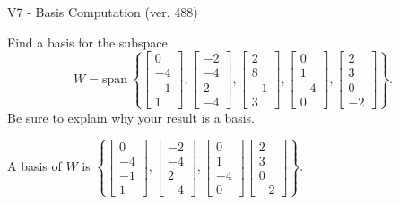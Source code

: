 \begin{exercise}
  \begin{exerciseTitle}V7 - Basis Computation (ver. 488)\end{exerciseTitle}
  \begin{exerciseStatement}
    Find a basis for the subspace 
\[W=\mathrm{span}\ \left\{\left[\begin{array}{r}
0 \\
-4 \\
-1 \\
1
\end{array}\right] , \left[\begin{array}{r}
-2 \\
-4 \\
2 \\
-4
\end{array}\right] , \left[\begin{array}{r}
2 \\
8 \\
-1 \\
3
\end{array}\right] , \left[\begin{array}{r}
0 \\
1 \\
-4 \\
0
\end{array}\right] , \left[\begin{array}{r}
2 \\
3 \\
0 \\
-2
\end{array}\right]\right\}.\]
 Be sure to explain why your result is a basis.


  \end{exerciseStatement}
  \begin{exerciseAnswer}
   A basis of \(W\) is  \(\left\{\left[\begin{array}{r}
0 \\
-4 \\
-1 \\
1
\end{array}\right] , \left[\begin{array}{r}
-2 \\
-4 \\
2 \\
-4
\end{array}\right] , \left[\begin{array}{r}
0 \\
1 \\
-4 \\
0
\end{array}\right] \left[\begin{array}{r}
2 \\
3 \\
0 \\
-2
\end{array}\right]\right\}\).
  


  \end{exerciseAnswer}
\end{exercise}